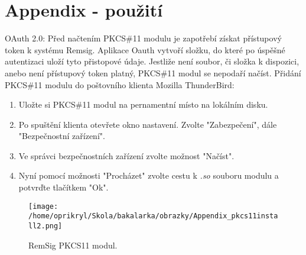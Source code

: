 \documentclass[]{fithesis3}
\begin{document}
\chapter{Appendix - použití}
	OAuth 2.0: \newline
	Před načtením PKCS\#11 modulu je zapotřebí získat přístupový token k systému Remsig. 			Aplikace Oauth vytvoří složku, do které po úspěšné autentizaci uloží tyto přistopové údaje. 			Jestliže není soubor, či složka k dispozici, anebo není přístupový token platný, PKCS\#11 modul 		se nepodaří načíst.
	\newline
	\newline
	Přidání PKCS\#11 modulu do poštovního klienta Mozilla ThunderBird:
	\begin{enumerate}
		\item Uložte si PKCS\#11 modul na pernamentní místo na lokálním disku.
		\item Po spuštění klienta otevřete okno nastavení. Zvolte "Zabezpečení", dále 					"Bezpečnostní zařízení".
		\item Ve správci bezpečnostních zařízení zvolte možnost "Načíst".
		\item Nyní pomocí možnosti "Procházet" zvolte cestu k \textit{.so} souboru modulu a 				potvrďte tlačítkem "Ok".
	\end{enumerate}
	
		\begin{figure}[!ht]
  			\begin{minipage}{1.00\textwidth}
    				\texttt{[image: /home/oprikryl/Skola/bakalarka/obrazky/Appendix\_pkcs11install2.png]}
  			\end{minipage}
 			\caption{RemSig PKCS11 modul.}
  			\label{fig:RemSig PKCS11 modul.}
		\end{figure}	
	
\end{document}
